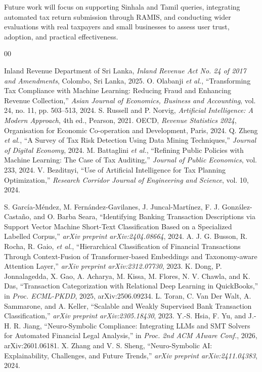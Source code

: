 \documentclass[conference]{IEEEtran}
\begin{document}
Future work will focus on supporting Sinhala and Tamil queries, integrating automated tax return submission through RAMIS, and conducting wider evaluations with real taxpayers and small businesses to assess user trust, adoption, and practical effectiveness.

\begin{thebibliography}{00}

 Inland Revenue Department of Sri Lanka, \textit{Inland Revenue Act No. 24 of 2017 and Amendments}, Colombo, Sri Lanka, 2025.
 O. Olabanji \textit{et al.}, ``Transforming Tax Compliance with Machine Learning: Reducing Fraud and Enhancing Revenue Collection,'' \textit{Asian Journal of Economics, Business and Accounting}, vol. 24, no. 11, pp. 503--513, 2024.
 S. Russell and P. Norvig, \textit{Artificial Intelligence: A Modern Approach}, 4th ed., Pearson, 2021.
 OECD, \textit{Revenue Statistics 2024}, Organisation for Economic Co-operation and Development, Paris, 2024.
 Q. Zheng \textit{et al.}, ``A Survey of Tax Risk Detection Using Data Mining Techniques,'' \textit{Journal of Digital Economy}, 2024.
 M. Battaglini \textit{et al.}, ``Refining Public Policies with Machine Learning: The Case of Tax Auditing,'' \textit{Journal of Public Economics}, vol. 233, 2024.
 V. Bezditnyi, ``Use of Artificial Intelligence for Tax Planning Optimization,'' \textit{Research Corridor Journal of Engineering and Science}, vol. 10, 2024.

 S. Garc\'ia-M\'endez, M. Fern\'andez-Gavilanes, J. Juncal-Mart\'inez, F. J. Gonz\'alez-Casta\~no, and O. Barba Seara, ``Identifying Banking Transaction Descriptions via Support Vector Machine Short-Text Classification Based on a Specialized Labelled Corpus,'' \textit{arXiv preprint arXiv:2404.08664}, 2024.
 A. J. G. Busson, R. Rocha, R. Gaio, \textit{et al.}, ``Hierarchical Classification of Financial Transactions Through Context-Fusion of Transformer-based Embeddings and Taxonomy-aware Attention Layer,'' \textit{arXiv preprint arXiv:2312.07730}, 2023.
 K. Dong, P. Jonnalagedda, X. Gao, A. Acharya, M. Kissa, M. Flores, N. V. Chawla, and K. Das, ``Transaction Categorization with Relational Deep Learning in QuickBooks,'' in \textit{Proc. ECML-PKDD}, 2025, arXiv:2506.09234.
 L. Toran, C. Van Der Walt, A. Sammarone, and A. Keller, ``Scalable and Weakly Supervised Bank Transaction Classification,'' \textit{arXiv preprint arXiv:2305.18430}, 2023.
 Y.-S. Hsia, F. Yu, and J.-H. R. Jiang, ``Neuro-Symbolic Compliance: Integrating LLMs and SMT Solvers for Automated Financial Legal Analysis,'' in \textit{Proc. 2nd ACM AIware Conf.}, 2026, arXiv:2601.06181.
 X. Zhang and V. S. Sheng, ``Neuro-Symbolic AI: Explainability, Challenges, and Future Trends,'' \textit{arXiv preprint arXiv:2411.04383}, 2024.


\end{thebibliography}
\end{document}
